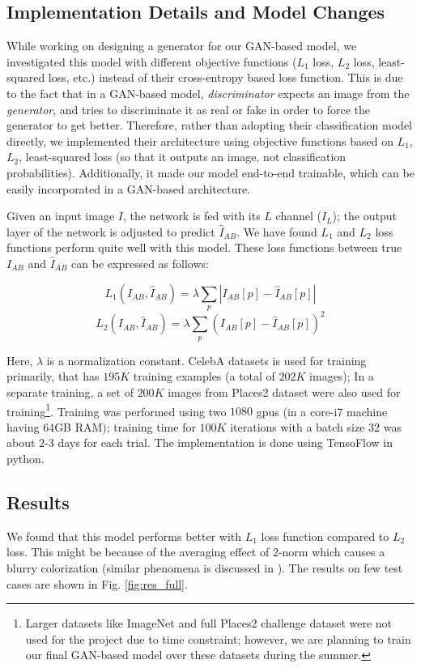 \documentclass[10pt]{article}
\begin{document}
\subsection{\textbf{Implementation Details and Model Changes}}
While working on designing a generator for our GAN-based model, we investigated this model with different objective functions ($L_1$ loss, $L_2$ loss, least-squared loss, etc.) instead of their cross-entropy based loss function. This is due to the fact that in a GAN-based model, \textit{discriminator} expects an image from the \textit{generator}, 
and tries to discriminate it as real or fake in order to force the generator to get better.  
Therefore, rather than adopting their classification model directly, we implemented their architecture 
using objective functions based on $L_1$, $L_2$, least-squared loss (so that it outputs an image, not classification probabilities). Additionally, it made our model end-to-end trainable, which can be easily incorporated in a GAN-based architecture. 

Given an input image $I$, the network is fed with its $L$ channel ($I_L$); the output layer of the network is adjusted to predict $\hat{I}_{AB}$. We have found $L_1$ and $L_2$ loss functions perform quite well with this model. These loss functions between true $I_{AB}$ and $\hat{I}_{AB}$ can be expressed as follows:

\[ L_1 (I_{AB}, \hat{I}_{AB}) = \lambda \sum_p | I_{AB}[p] - \hat{I}_{AB}[p] | \]  
\[ L_2 (I_{AB}, \hat{I}_{AB}) = \lambda \sum_p ( I_{AB}[p] - \hat{I}_{AB}[p] )^2 \]  

Here, $\lambda$ is a normalization constant. CelebA datasets \cite{celebA} is used for training primarily, that has $195K$ training examples (a total of  $202K$ images); 
In a separate training, a set of $200K$ images from Places2 dataset \cite{places2} were also used for training\footnote{Larger datasets like ImageNet \cite{deng2009imagenet} and full Places2 challenge dataset were not used for the project due to time constraint; however, we are planning to train our final GAN-based model over these datasets during the summer.}. Training was performed using two $1080$ gpus (in a core-i7 machine having $64$GB RAM); training time for $100K$ iterations with a batch size $32$ was about $2$-$3$ days for each trial. The implementation is done using TensoFlow \cite{abadi2016tensorflow} in python.    

\subsection{\textbf{Results}}
We found that this model performs better with $L_1$ loss function compared to $L_2$ loss. This might be because of the averaging effect of $2$-norm which causes a blurry colorization (similar phenomena is discussed in \cite{zhang2016colorful}). The results on few test cases are shown in Fig. \ref{fig:res_full}. 
\end{document}
